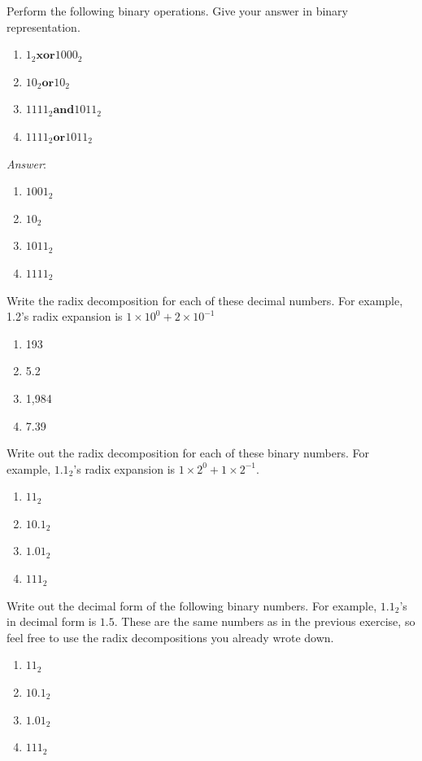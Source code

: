 \begin{example}
Perform the following binary operations. Give your answer in binary representation. 
\begin{enumerate}
\item $1_2 \textbf{xor}1000_2$
\item $10_2 \textbf{or} 10_2$
\item $1111_2 \textbf{and} 1011_2$
\item $1111_2 \textbf{or} 1011_2$
\end{enumerate}
\noindent \emph{Answer}:
\begin{enumerate}
\item $1001_2$
\item $10_2$
\item $1011_2$
\item $1111_{2}$
\end{enumerate}
\end{example}

\exercisesection

\begin{exercise}
Write the radix decomposition for each of these decimal numbers. For example, 1.2's radix expansion is $1\times10^0 + 2\times10^{-1}$
\begin{enumerate}
\item 193 
\item 5.2
\item 1,984
\item 7.39
\end{enumerate}
\end{exercise}

\begin{exercise}
Write out the radix decomposition for each of these binary numbers. For example, $1.1_2$'s radix expansion is $1\times2^0 + 1\times2^{-1}$. 
\begin{enumerate}
\item $11_2$
\item $10.1_2$
\item $1.01_2$
\item $111_2$
\end{enumerate}
\end{exercise}

\begin{exercise}
Write out the decimal form of the following binary numbers. For example, $1.1_2$'s in decimal form is $1.5$. These are the same numbers as in the previous exercise, so feel free to use the radix decompositions you already wrote down. 
\begin{enumerate}
\item $11_2$
\item $10.1_2$
\item $1.01_2$
\item $111_2$
\end{enumerate}
\end{exercise}

